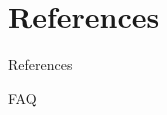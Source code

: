 \documentclass{beamer}
\begin{document}

\section{References}
\begin{frame}[t,allowframebreaks]{References}
  \nocite{*}
  \RaggedRight
  \printbibliography
\end{frame}


\begin{frame}{FAQ}

\end{frame}
\end{document}
